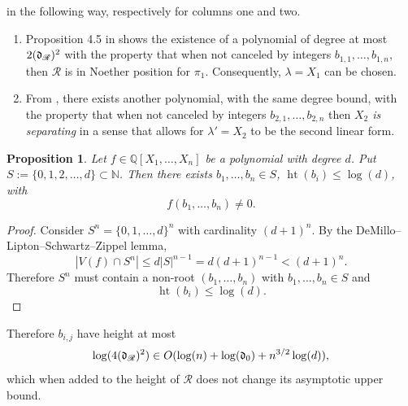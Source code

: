 \documentclass[12pt]{article}
\DeclareMathOperator{\htt}{ht}
\def\sR {\mathscr{R}}
\newtheorem{prop}[theorem]{Proposition}
\begin{document}
in the following way, respectively for columns one and two.
\begin{enumerate}
    \item Proposition 4.5 in \cite{SharpEstimatesForTheEffectiveN} shows the existence of a polynomial of degree at most $2(\frak{d}_{\sR})^2$ with the property that when  not canceled by integers $b_{1,1},\hdots,b_{1,n}$, then $\sR$ is in Noether position for $\pi_1$. Consequently, $\lambda=X_1$ can be chosen.
    
    \item From \cite[Corollary 3.5]{DURVYE2008101}, there exists another polynomial, with the same degree bound, with the property that when not canceled by integers
    $b_{2,1},\hdots,b_{2,n}$    
    then \textit{$X_2$ is separating} in a sense that allows for $\lambda'=X_2$ to be the second linear form.  
\end{enumerate}

\begin{prop}
    Let $f \in \mathbb{Q}[X_1,\hdots,X_n]$ be a polynomial with degree $d$. Put $S := \{0,1,2,\hdots,d\} \subset \mathbb{N}$. Then there exists $b_1,\hdots,b_n \in S$, $\htt(b_i) \leq \log(d)$, with \[f(b_1,\hdots,b_n)\not = 0.\]
\end{prop}
\begin{proof}
        Consider $S^n = \{0,1,\hdots,d\}^n$ with cardinality $(d+1)^n$. By the DeMillo–Lipton–Schwartz–Zippel lemma, 
        \[
        |V(f) \cap S^n| \leq d|S|^{n-1}=d(d+1)^{n-1} < (d+1)^{n}.
        \]
        Therefore $S^n$ must contain a non-root $(b_1,\hdots,b_n)$ with $b_1,\hdots,b_n \in S$ and \[\htt(b_i) \leq \log(d).\]
\end{proof}
\noindent
Therefore $b_{i,j}$ have height at most
\[
\log(4(\frak{d}_{\sR})^2)
\in O(\log(n) + \log(\frak{d}_0) + n^{3/2}\log(d)),
\]
which when added to the height of $\sR$ does not change its asymptotic upper bound. 
\end{document}
